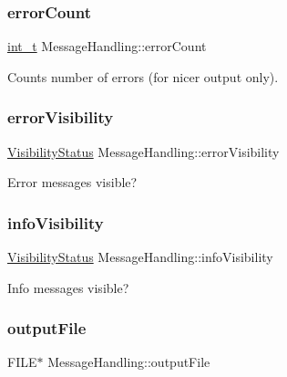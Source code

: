 \subsubsection{\texorpdfstring{error\+Count}{errorCount}}
{\footnotesize\ttfamily \hyperlink{_types_8hpp_ab6fd6105e64ed14a0c9281326f05e623}{int\+\_\+t} Message\+Handling\+::error\+Count\hspace{0.3cm}{\ttfamily [protected]}}

Counts number of errors (for nicer output only). \mbox{\label{class_message_handling_af75a2fd3122cc2a9793c5ad491b04325}} 
\subsubsection{\texorpdfstring{error\+Visibility}{errorVisibility}}
{\footnotesize\ttfamily \hyperlink{_types_8hpp_a36503475bb1fea0a7fd7087259ee63c1}{Visibility\+Status} Message\+Handling\+::error\+Visibility\hspace{0.3cm}{\ttfamily [protected]}}

Error messages visible? \mbox{\label{class_message_handling_a6a630fa427803cf4e1e0f54d8fb14a1b}} 
\subsubsection{\texorpdfstring{info\+Visibility}{infoVisibility}}
{\footnotesize\ttfamily \hyperlink{_types_8hpp_a36503475bb1fea0a7fd7087259ee63c1}{Visibility\+Status} Message\+Handling\+::info\+Visibility\hspace{0.3cm}{\ttfamily [protected]}}

Info messages visible? \mbox{\label{class_message_handling_a2a40cbdfced701a18da281f7a4e910ee}} 
\subsubsection{\texorpdfstring{output\+File}{outputFile}}
{\footnotesize\ttfamily F\+I\+LE$\ast$ Message\+Handling\+::output\+File\hspace{0.3cm}{\ttfamily [protected]}}

